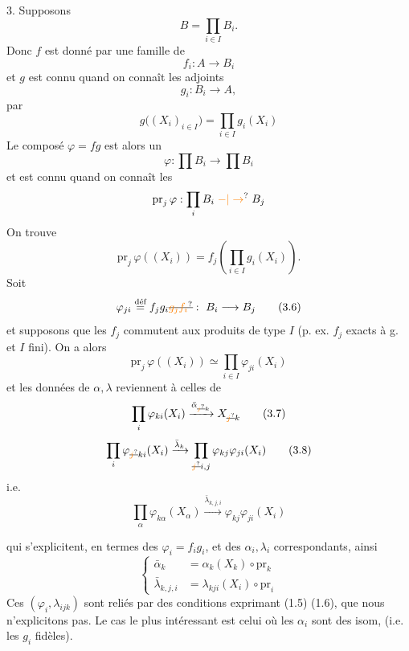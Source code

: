 3. Supposons
\[
 \boxed{B=\prod_{i\in I}B_i}. \tag*{(3.1)}
\]
Donc $f$ est donné par une famille de
\[
 f_i:A\longrightarrow B_i \tag*{(3.2)}
\]
et $g$ est connu quand on connaît les adjoints
\[
 g_i:B_i\longrightarrow A, \tag*{(3.3)}
\]
par
\[
 g\bigl((X_i)_{i\in I}\bigr)=\prod_{i\in I}g_i(X_i) \tag*{(3.4)}
\]
Le composé $\varphi=fg$ est alors un 
\[
 \varphi:\prod B_i\longrightarrow\prod B_i
\]
et est connu quand on connaît les
\[
 \mathrm{pr}_{j}\,\varphi:\prod_i B_i\mathrel{\unsure{-|\to}}B_j
\]
On trouve
\[
 \mathrm{pr}_j\,\varphi((X_i))=f_j\left(\prod_{i\in I}g_i(X_i)\right). \tag*{(3.5)}
\]
Soit
\[
 \varphi_{ji}\overset{\text{déf}}{=}f_jg_i\deleted{\unsure{g_j f_i}}:\ B_i\longrightarrow B_j \tag*{(3.6)}
\]
et supposons que les $f_j$ commutent aux produits de type $I$ (p. ex. $f_j$ exacts à g. et $I$ fini). On a alors
\[
 \mathrm{pr}_j\,\varphi((X_i))\simeq\prod_{i\in I}\varphi_{ji}(X_i) \tag*{(3.6)}
\]
et les données de $\alpha,\lambda$ reviennent à celles de
\[
 \prod_i\varphi_{ki}(X_i)\xrightarrow{\bar\alpha_{\deleted{\unsure{j}}k}}X_{\deleted{\unsure{j}}k} \tag*{(3.7)}
\]
\[
 \prod_i\varphi_{\deleted{\unsure{j}}ki}(X_i)\xrightarrow{\bar\lambda_k}
 \prod_{\deleted{\unsure{j}}i,j}\varphi_{kj}\varphi_{ji}(X_i) \tag*{(3.8)}
\]
i.e.
\[
 \prod_\alpha\varphi_{k\alpha}(X_\alpha)\xrightarrow{\bar\lambda_{k,j,i}}\varphi_{kj}\varphi_{ji}(X_i)
\]

qui s'explicitent, en termes des $\varphi_i=f_i g_i$, et des $\alpha_i,\lambda_i$ correspondants, ainsi
\[
 \left\{\begin{aligned}
 \bar\alpha_k&=\alpha_k(X_k)\circ\mathrm{pr}_k\\
 \bar\lambda_{k,j,i}&=\lambda_{kji}(X_i)\circ\mathrm{pr}_i
 \end{aligned}\right. \tag*{(3.9)}
\]
Ces $(\varphi_i,\lambda_{ijk})$ sont reliés par des conditions exprimant (1.5) (1.6), que nous n'explicitons pas.  Le cas le plus intéressant est celui où les  $\alpha_i$ sont des isom, (i.e. les $g_i$  fidèles).

